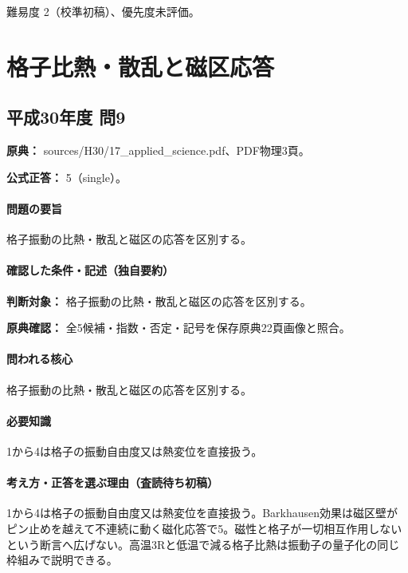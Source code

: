 \par 難易度 2（校準初稿）、優先度未評価。

\section{格子比熱・散乱と磁区応答}

\subsection{平成30年度 問9}
\label{q:h30-reg-applied-09}

\noindent\textbf{原典：} sources/H30/17\_applied\_science.pdf、PDF物理3頁。

\textbf{公式正答：} 5（single）。

\paragraph{問題の要旨} 格子振動の比熱・散乱と磁区の応答を区別する。

\paragraph{確認した条件・記述（独自要約）}\mbox{}\par

\noindent\textbf{判断対象：} 格子振動の比熱・散乱と磁区の応答を区別する。\par

\noindent\textbf{原典確認：} 全5候補・指数・否定・記号を保存原典22頁画像と照合。\par

\paragraph{問われる核心} 格子振動の比熱・散乱と磁区の応答を区別する。

\paragraph{必要知識} 1から4は格子の振動自由度又は熱変位を直接扱う。

\paragraph{考え方・正答を選ぶ理由（査読待ち初稿）} 1から4は格子の振動自由度又は熱変位を直接扱う。Barkhausen効果は磁区壁がピン止めを越えて不連続に動く磁化応答で5。磁性と格子が一切相互作用しないという断言へ広げない。高温3Rと低温で減る格子比熱は振動子の量子化の同じ枠組みで説明できる。

